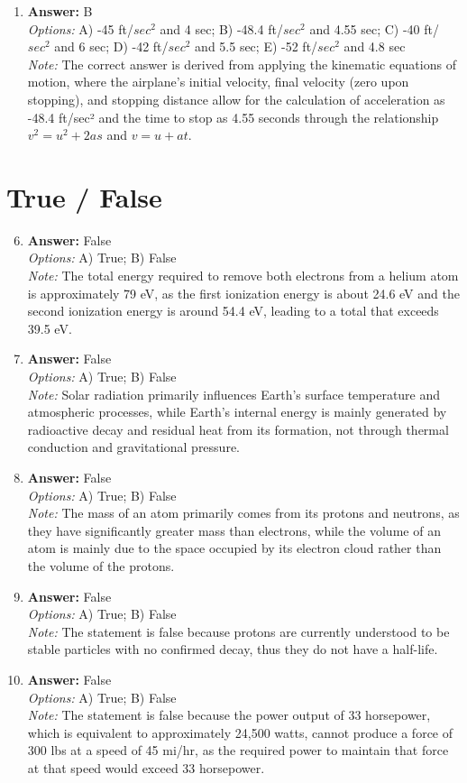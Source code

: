 \documentclass[12pt]{article}
\begin{document}
\begin{enumerate}[label=\arabic*.]
\item \textbf{Answer:} B
\\ \textit{Options:} A) -45 ft/$sec^2$ and 4 sec; B) -48.4 ft/$sec^2$ and 4.55 sec; C) -40 ft/$sec^2$ and 6 sec; D) -42 ft/$sec^2$ and 5.5 sec; E) -52 ft/$sec^2$ and 4.8 sec
\\ \textit{Note:} The correct answer is derived from applying the kinematic equations of motion, where the airplane's initial velocity, final velocity (zero upon stopping), and stopping distance allow for the calculation of acceleration as -48.4 ft/sec² and the time to stop as 4.55 seconds through the relationship \( v^2 = u^2 + 2 as \) and \( v = u + at \).
\end{enumerate}

\section*{True / False}
\begin{enumerate}[label=\arabic*.]
\setcounter{enumi}{5}
\item \textbf{Answer:} False
\\ \textit{Options:} A) True; B) False
\\ \textit{Note:} The total energy required to remove both electrons from a helium atom is approximately 79 eV, as the first ionization energy is about 24.6 eV and the second ionization energy is around 54.4 eV, leading to a total that exceeds 39.5 eV.
\item \textbf{Answer:} False
\\ \textit{Options:} A) True; B) False
\\ \textit{Note:} Solar radiation primarily influences Earth's surface temperature and atmospheric processes, while Earth's internal energy is mainly generated by radioactive decay and residual heat from its formation, not through thermal conduction and gravitational pressure.
\item \textbf{Answer:} False
\\ \textit{Options:} A) True; B) False
\\ \textit{Note:} The mass of an atom primarily comes from its protons and neutrons, as they have significantly greater mass than electrons, while the volume of an atom is mainly due to the space occupied by its electron cloud rather than the volume of the protons.
\item \textbf{Answer:} False
\\ \textit{Options:} A) True; B) False
\\ \textit{Note:} The statement is false because protons are currently understood to be stable particles with no confirmed decay, thus they do not have a half-life.
\item \textbf{Answer:} False
\\ \textit{Options:} A) True; B) False
\\ \textit{Note:} The statement is false because the power output of 33 horsepower, which is equivalent to approximately 24,500 watts, cannot produce a force of 300 lbs at a speed of 45 mi/hr, as the required power to maintain that force at that speed would exceed 33 horsepower.
\end{enumerate}
\end{document}
